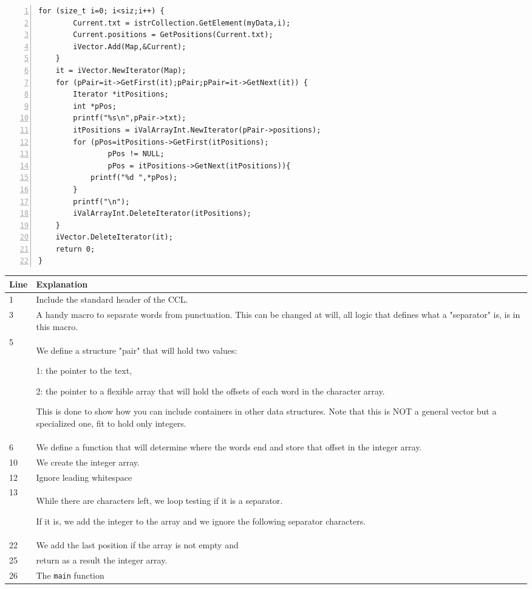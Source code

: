 \documentclass[12pt,a4paper,openany]{memoir} %
\begin{document}
{{\begin{Verbatim}[numbers=left]
    for (size_t i=0; i<siz;i++) {
        Current.txt = istrCollection.GetElement(myData,i);
        Current.positions = GetPositions(Current.txt);
        iVector.Add(Map,&Current);
    }   
    it = iVector.NewIterator(Map);
    for (pPair=it->GetFirst(it);pPair;pPair=it->GetNext(it)) {
        Iterator *itPositions;
        int *pPos;
        printf("%s\n",pPair->txt);
        itPositions = iValArrayInt.NewIterator(pPair->positions);
        for (pPos=itPositions->GetFirst(itPositions);
                pPos != NULL;
                pPos = itPositions->GetNext(itPositions)){
            printf("%d ",*pPos);
        }   
        printf("\n");
        iValArrayInt.DeleteIterator(itPositions);
    }   
    iVector.DeleteIterator(it);
    return 0;
}
\end{Verbatim}
{\small
\begin{longtable}{|p{1.0cm}|p{13.5cm}|}
\hline
Line& Explanation\\\hline
1 & Include the standard header of the CCL.\\\hline
3 & A handy macro to separate words from punctuation.
  This can be changed at will, all logic that defines what a "separator" is, is in this macro.\\\hline
5 & We define a structure "pair" that will hold two values:
\par 1: the pointer to the text, \par 2: the pointer to a
   flexible array that will hold the offsets of each
   word in the character array. \par This is done to show how you can include containers in other data structures.
 Note that this is NOT
   a general vector but a specialized one, fit to hold
   only integers.\\\hline
6 & We define a function that will determine where the
   words end and store that offset in the integer array.\\\hline
10& We create the integer array.\\\hline
12& Ignore leading whitespace\\\hline
13& While there are characters left, we loop testing if it
   is a separator.\par If it is, we add the integer to the array
   and we ignore the following separator characters.\\\hline
22& We add the last position if the array is not empty and\\
25& return as a result the integer array.\\\hline
26&The \texttt{main} function\\\hline

\end{longtable}}}}
\end{document}
